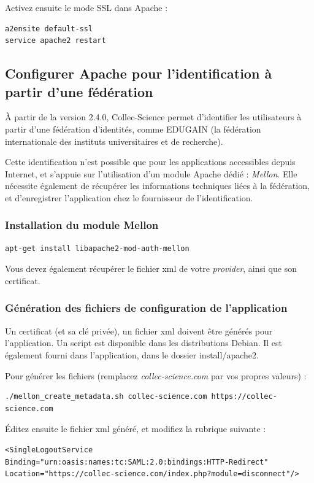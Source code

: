 Activez ensuite le mode SSL dans Apache :
\begin{lstlisting}
a2ensite default-ssl
service apache2 restart
\end{lstlisting}

\subsection{Configurer Apache pour l'identification à partir d'une fédération}
\label{mellon}
À partir de la version 2.4.0, Collec-Science permet d'identifier les utilisateurs à partir d'une fédération d'identités, comme EDUGAIN (la fédération internationale des instituts universitaires et de recherche).

Cette identification n'est possible que pour les applications accessibles depuis Internet, et s'appuie sur l'utilisation d'un module Apache dédié : \textit{Mellon}. Elle nécessite également de récupérer les informations techniques liées à la fédération, et d'enregistrer l'application chez le fournisseur de l'identification.

\subsubsection{Installation du module Mellon}
\begin{lstlisting}
apt-get install libapache2-mod-auth-mellon
\end{lstlisting}

Vous devez également récupérer le fichier xml de votre \textit{provider}, ainsi que son certificat.

\subsubsection{Génération des fichiers de configuration de l'application}
Un certificat (et sa clé privée), un fichier xml doivent être générés pour l'application. Un script est disponible dans les distributions Debian. Il est également fourni dans l'application, dans le dossier install/apache2.

Pour générer les fichiers (remplacez \textit{collec-science.com} par vos propres valeurs) : 
\begin{lstlisting}
./mellon_create_metadata.sh collec-science.com https://collec-science.com
\end{lstlisting}

Éditez ensuite le fichier xml généré, et modifiez la rubrique suivante :
\begin{lstlisting}
<SingleLogoutService Binding="urn:oasis:names:tc:SAML:2.0:bindings:HTTP-Redirect" Location="https://collec-science.com/index.php?module=disconnect"/>
\end{lstlisting}

